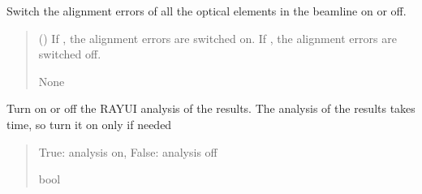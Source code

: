 \documentclass[letterpaper,10pt,english]{sphinxmanual}
\begin{document}
\begin{fulllineitems}
\begin{fulllineitems}
\label{\detokenize{API:raypyng.simulate.Simulate.alignment_errors}}
\pysigstartsignatures
\pysiglinewithargsret
{}
{}
{}
\pysigstopsignatures
\sphinxAtStartPar
Switch the alignment errors of all the optical elements in the beamline on or off.
\begin{quote}\begin{description}
\sphinxAtStartPar
{} (\sphinxstyleliteralemphasis{\sphinxupquote{, }}) \textendash{} If , the alignment errors are switched on.
If , the alignment errors are switched off.

\sphinxAtStartPar
None

\end{description}\end{quote}

\end{fulllineitems}


\begin{fulllineitems}
\label{\detokenize{API:raypyng.simulate.Simulate.analyze}}
\pysigstartsignatures
\pysigline
{}
\pysigstopsignatures
\sphinxAtStartPar
Turn on or off the RAY\sphinxhyphen{}UI analysis of the results.
The analysis of the results takes time, so turn it on only if needed
\begin{quote}\begin{description}
\sphinxAtStartPar
True: analysis on, False: analysis off

\sphinxAtStartPar
bool

\end{description}\end{quote}

\end{fulllineitems}



\end{fulllineitems}
\end{document}
